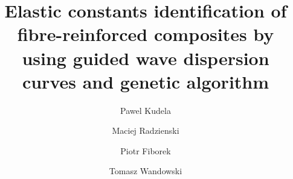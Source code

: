 \documentclass[preprint,12pt]{elsarticle}
\begin{document}
	\begin{frontmatter}
		
		\title{Elastic constants identification of fibre-reinforced composites by using guided wave dispersion curves and genetic algorithm}
		
		\address[IFFM]{Institute of Fluid Flow Machinery, Polish Academy of Sciences, Poland}
		
		
		\author{Pawel Kudela}
		\author{Maciej Radzienski}
		\author{Piotr Fiborek }
		\author{Tomasz Wandowski }	
		

\end{frontmatter}
\end{document}
